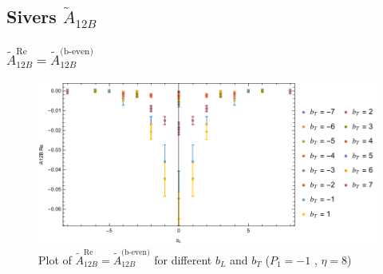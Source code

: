 \documentclass[]{article}
\numberwithin{equation}{section}
\newcommand{\tAmp}{\widetilde{A}}
\newcommand{\tAmp}{\ensuremath{\widetilde{A}^{(+)}}}
\begin{document}
\subsection{Sivers $\tAmp_{12B}$}
\subsubsection{$\tAmp^{\text{Re}}_{12B}=\tAmp^{\text{(b-even)}}_{12B}$}
\begin{figure}[h!]
    \centering
    \includegraphics[width=0.45\linewidth]{bLbT_A12B_b_even_P1_-1_eta_8.pdf}
    \caption{Plot of  $\tAmp^{\text{Re}}_{12B}=\tAmp^{\text{(b-even)}}_{12B}$ for different $b_{L}$ and $b_{T}$  ($P_{1} = -1$ , $\eta=8$)}
\end{figure}
\end{document}
